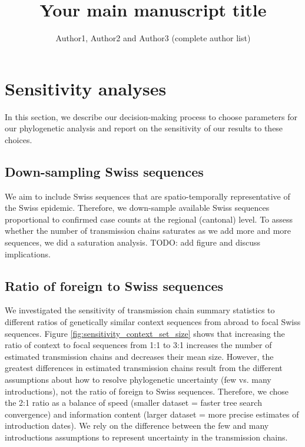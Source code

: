 \documentclass[9pt,twoside,lineno]{pnas-new}
\title{Your main manuscript title}
\author{Author1, Author2 and Author3 (complete author list)}
\begin{document}

\maketitle 

\SItext


\section{Sensitivity analyses}

In this section, we describe our decision-making process to choose parameters for our phylogenetic analysis and report on the sensitivity of our results to these choices. 

\subsection{Down-sampling Swiss sequences}
We aim to include Swiss sequences that are spatio-temporally representative of the Swiss epidemic. Therefore, we down-sample available Swiss sequences proportional to confirmed case counts at the regional (cantonal) level. To assess whether the number of transmission chains saturates as we add more and more sequences, we did a saturation analysis. TODO: add figure and discuss implications.

\subsection{Ratio of foreign to Swiss sequences}
We investigated the sensitivity of transmission chain summary statistics to different ratios of genetically similar context sequences from abroad to focal Swiss sequences. Figure \ref{fig:sensitivity_context_set_size} shows that increasing the ratio of context to focal sequences from 1:1 to 3:1 increases the number of estimated transmission chains and decreases their mean size. However, the greatest differences in estimated transmission chains result from the different assumptions about how to resolve phylogenetic uncertainty (few vs. many introductions), not the ratio of foreign to Swiss sequences. Therefore, we chose the 2:1 ratio as a balance of speed (smaller dataset = faster tree search convergence) and information content (larger dataset = more precise estimates of introduction dates). We rely on the difference between the few and many introductions assumptions to represent uncertainty in the transmission chains.
\end{document}
